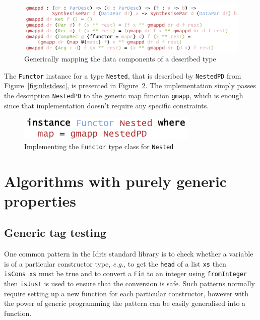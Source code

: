 \documentclass{ituthesis}
\newcommand{\tttype}[1]{\textcolor{type-color}{\texttt{#1}}}
\newcommand{\ttdec}[1]{\textcolor{declared-var-color}{\texttt{#1}}}
\newcommand{\ttvar}[1]{\textcolor{local-var-color}{\texttt{#1}}}
\theoremstyle{break}
\begin{document}
\begin{figure}[ht]
\begin{center}
    \includegraphics[scale=0.5]{Figures/GenericMapDesc.png}
\end{center}
\caption{Generically mapping the data components of a described type}
\label{fig:mapgendesc}
\end{figure}

The \tttype{Functor} instance for a type \ttdec{Nested}, that is described by \ttdec{NestedPD} from Figure~\ref{fig:nlistdesc}, is presented in Figure~\ref{fig:functorinst}.
The implementation simply passes the description \ttdec{NestedPD} to the generic map function \ttdec{gmapp}, which is enough since that implementation doesn't require any specific constraints.

\begin{figure}[ht]
\begin{center}
    \includegraphics[scale=0.5]{Figures/GenericFunctorInstance.png}
\end{center}
\caption{Implementing the \tttype{Functor} type class for \ttdec{Nested}}
\label{fig:functorinst}
\end{figure}

\section{Algorithms with purely generic properties}
\label{sec:Algorithms with purely generic properties}
\subsection{Generic tag testing}
\label{sub:Generic tag testing}
One common pattern in the Idris standard library is to check whether a variable is of a particular constructor type, \textit{e.g.},
to get the \ttdec{head} of a list \ttvar{xs} then \ttdec{isCons}~\ttvar{xs} must be true and to convert a \tttype{Fin} to an integer using \ttdec{fromInteger} then \ttdec{isJust} is used to ensure that the conversion is safe.
Such patterns normally require setting up a new function for each particular constructor, however with the power of generic programming the pattern can be easily generalised into a function.
\end{document}
